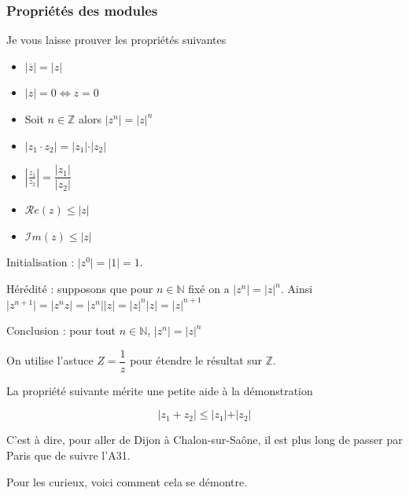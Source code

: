 \documentclass[french]{book}
\newcommand{\ab}[1]{\vert #1 \vert}
\newcommand{\ie}{\leq}
\newcommand{\calr}{\mathscr{R}}
\newcommand{\cali}{\mathscr{I}}
\newcommand{\RR}{\calr }
\newcommand{\IR}{\cali }
\newcommand{\ssi}{\Longleftrightarrow}
\newcommand{\cacheg}[1]{#1}
\begin{document}
\subsubsection{Propriétés des modules}

Je vous laisse prouver les propriétés suivantes





  \begin{prop}[]
    \begin{itemize}
\item[$\bullet$] $\ab{\overline{z}}=\cacheg{\ab{z}}$
\item[$\bullet$] $\ab{z}=0\ssi \cacheg{ z=0}$
\item[$\bullet$] Soit $n\in\mathbb{Z}$ alors $\ab{z^n}=\ab{z}^n$
\item[$\bullet$] $\ab{z_1\cdot z_2}=\cacheg{\ab{z_1}\cdot\ab{z_2}}$
\item[$\bullet$] $\left|\frac{z_1}{z_2}\right|=\dfrac{\ab{z_1}}{\ab{z_2}}$
\item[$\bullet$] $\RR e(z)\ie \cacheg{\ab{z}}$
\item[$\bullet$] $\IR m(z)\ie \cacheg{\ab{z}}$
\end{itemize}
    \end{prop}
  
\begin{demo}[$n\in\mathbb{Z}$, $\ab{z^n}=\ab{z}^n$ par récurrence]
Initialisation : $\ab{z^0}=\ab{1}=1$. 

Hérédité : supposons que pour $n \in \mathbb{N}$ fixé on a $\ab{z^n}=\ab{z}^n$.
Ainsi $\ab{z^{n+1}}=\ab{z^n z}=\ab{z^n} \ab{z} = \ab{z}^n \ab{z} =\ab{z}^{n+1}$

Conclusion :  pour tout $n\in\mathbb{N}$, $\ab{z^n}=\ab{z}^n$

On utilise l'astuce $Z=\dfrac{1}{z}$ pour étendre le résultat sur $\mathbb{Z}$.
\end{demo}

La propriété suivante mérite une petite aide à la démonstration


  \begin{prop}
    $$\ab{z_1+z_2}\ie\ab{z_1}+\ab{z_2}$$
    \end{prop}
  



C'est  à dire, pour  aller de  Dijon à  Chalon-sur-Saône, il  est plus long de
passer par Paris que de suivre l'A31.  

Pour les curieux, voici comment cela se démontre.
\end{document}
